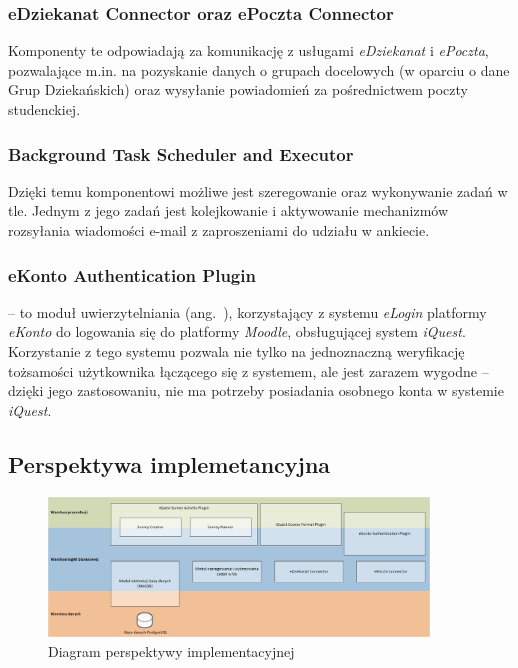 \subsubsection{eDziekanat Connector oraz ePoczta Connector}
\label{Chapter5423}

Komponenty te odpowiadają za komunikację z usługami \textit{eDziekanat} i \textit{ePoczta}, pozwalające m.in. na pozyskanie danych o grupach docelowych (w oparciu o dane Grup Dziekańskich) oraz wysyłanie powiadomień za pośrednictwem poczty studenckiej.

\subsubsection{Background Task Scheduler and Executor}
\label{Chapter5424}

Dzięki temu komponentowi możliwe jest szeregowanie oraz wykonywanie zadań w tle. Jednym z jego zadań jest kolejkowanie i aktywowanie mechanizmów rozsyłania wiadomości e-mail z zaproszeniami do udziału w ankiecie.

\subsubsection{eKonto Authentication Plugin}
\label{Chapter5425}

 -- to moduł uwierzytelniania (ang.~), korzystający z systemu \textit{eLogin} platformy \textit{eKonto} do logowania się do platformy \textit{Moodle}, obsługującej system \textit{iQuest}. Korzystanie z tego systemu pozwala nie tylko na jednoznaczną weryfikację tożsamości użytkownika łączącego się z systemem, ale jest zarazem wygodne -- dzięki jego zastosowaniu, nie ma potrzeby posiadania osobnego konta w systemie \textit{iQuest}.

\subsection{Perspektywa implemetancyjna}
\label{Chapter543}

\begin{figure}[H]
\centering\includegraphics[width=0.9\textwidth]{figures/Layers}
\caption{Diagram perspektywy implementacyjnej}\label{rys:PerspektywaImplementacyjna}
\end{figure}


